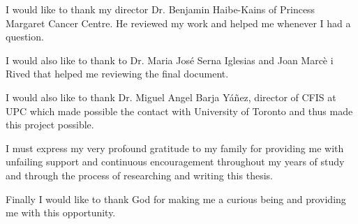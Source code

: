 

I would like to thank my director Dr. Benjamin Haibe-Kains of Princess Margaret Cancer 
Centre. He reviewed my work and helped me whenever I had a question.

I would also like to thank to Dr. Maria José Serna Iglesias and Joan Marcè i Rived 
that helped me reviewing the final document.

I would also like to thank Dr. Miguel Angel Barja Yáñez, director of CFIS at UPC which 
made possible the contact with University of Toronto and thus made this project possible.

I must express my very profound gratitude to my family for providing me with unfailing 
support and continuous encouragement throughout my years of study and through the process 
of researching and writing this thesis. 

Finally I would like to thank God for making me a curious being and providing me with 
this opportunity.


